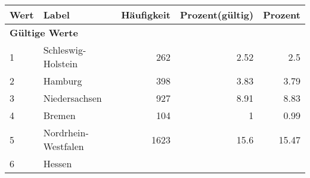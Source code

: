      \begin{longtable}{lXrrr}
     \toprule
     \textbf{Wert} & \textbf{Label} & \textbf{Häufigkeit} & \textbf{Prozent(gültig)} & \textbf{Prozent} \\
     \endhead
     \midrule
     \multicolumn{5}{l}{\textbf{Gültige Werte}}\\

     1 &
     \multicolumn{1}{X}{ Schleswig-Holstein   } &


       \num{262} &
       \num[round-mode=places,round-precision=2]{2.52} &
         \num[round-mode=places,round-precision=2]{2.5} \\

     2 &
     \multicolumn{1}{X}{ Hamburg   } &


       \num{398} &
       \num[round-mode=places,round-precision=2]{3.83} &
         \num[round-mode=places,round-precision=2]{3.79} \\

     3 &
     \multicolumn{1}{X}{ Niedersachsen   } &


       \num{927} &
       \num[round-mode=places,round-precision=2]{8.91} &
         \num[round-mode=places,round-precision=2]{8.83} \\

     4 &
     \multicolumn{1}{X}{ Bremen   } &


       \num{104} &
       \num[round-mode=places,round-precision=2]{1} &
         \num[round-mode=places,round-precision=2]{0.99} \\

     5 &
     \multicolumn{1}{X}{ Nordrhein-Westfalen   } &


       \num{1623} &
       \num[round-mode=places,round-precision=2]{15.6} &
         \num[round-mode=places,round-precision=2]{15.47} \\

     6 &
     \multicolumn{1}{X}{ Hessen   } &



\end{longtable}
